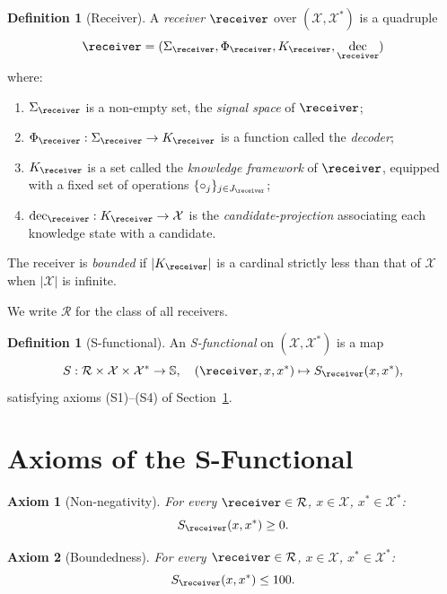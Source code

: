 \documentclass[11pt,a4paper]{article}
\theoremstyle{thmstyle}
\theoremstyle{thmstyle}
\newtheorem{axiom}{Axiom}
\theoremstyle{definition}
\newtheorem{definition}[theorem]{Definition}
\theoremstyle{remark}
\DeclareMathOperator{\dec}{dec}
\newcommand{\Sscale}{\mathbb{S}}
\newcommand{\Receiver}{\mathcal{R}}
\newcommand{\Cands}{\mathcal{X}}
\newcommand{\Truth}{\mathcal{X}^{*}}
\newcommand{\Sscalar}{S}
\begin{document}
\begin{definition}[Receiver]\label{def:receiver}
A \emph{receiver} $\receiver$ over $(\Cands, \Truth)$ is a
quadruple
\[
\receiver = (\Sigma_{\receiver}, \Phi_{\receiver},
              K_{\receiver}, \dec_{\receiver})
\]
where:
\begin{enumerate}[nosep,label=(\roman*)]
\item $\Sigma_{\receiver}$ is a non-empty set, the
      \emph{signal space} of $\receiver$;
\item $\Phi_{\receiver}: \Sigma_{\receiver} \to K_{\receiver}$
      is a function called the \emph{decoder};
\item $K_{\receiver}$ is a set called the
      \emph{knowledge framework} of $\receiver$,
      equipped with a fixed set of operations
      $\{\circ_{j}\}_{j \in J_{\receiver}}$;
\item $\dec_{\receiver}: K_{\receiver} \to \Cands$ is the
      \emph{candidate-projection} associating each
      knowledge state with a candidate.
\end{enumerate}
The receiver is \emph{bounded} if $|K_{\receiver}|$ is a
cardinal strictly less than that of $\Cands$ when
$|\Cands|$ is infinite.
\end{definition}

We write $\Receiver$ for the class of all receivers.

\begin{definition}[S-functional]\label{def:s-functional}
An \emph{S-functional} on $(\Cands, \Truth)$ is a map
\[
\Sscalar : \Receiver \times \Cands \times \Truth \to \Sscale,
\quad (\receiver, x, x^{*}) \mapsto \Sscalar_{\receiver}(x, x^{*}),
\]
satisfying axioms (S1)--(S4) of Section~\ref{sec:s-axioms}.
\end{definition}

\section{Axioms of the S-Functional}
\label{sec:s-axioms}

\begin{axiom}[Non-negativity]\label{ax:S1}
For every $\receiver \in \Receiver$, $x \in \Cands$,
$x^{*} \in \Truth$:
\[
\Sscalar_{\receiver}(x, x^{*}) \geq 0.
\]
\end{axiom}

\begin{axiom}[Boundedness]\label{ax:S2}
For every $\receiver \in \Receiver$, $x \in \Cands$,
$x^{*} \in \Truth$:
\[
\Sscalar_{\receiver}(x, x^{*}) \leq 100.
\]
\end{axiom}
\end{document}
